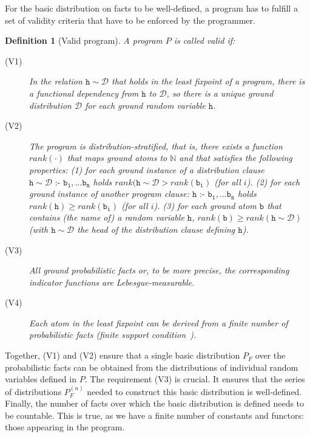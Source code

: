 \documentclass{tlp}
\newtheorem{definition}{Definition}
\newcommand{\coloneq}{\mbox{ :- }}
\begin{document}
For the basic distribution on facts to be well-defined, a program has
to fulfill a set of validity criteria that have to be enforced by the
programmer.

\begin{definition}[Valid program]
  \label{def:validprog}
  A program $P$ is called \emph{valid} if: 

 \begin{description}
  \item[(V1)] In the relation $\mathtt{h} \sim \mathcal{D}$ that holds
    in the least fixpoint of a program, there is a functional
    dependency from $\mathtt{h}$ to $ \mathcal{D}$, so there is a
    unique ground distribution $ \mathcal{D}$ for each ground random
    variable $\mathtt{h}$.

  \item[(V2)] The program is \emph{distribution-stratified}, that is,
    there exists a function $rank(\cdot)$ that maps ground atoms to
   $\mathbb{N}$ and that satisfies the following properties: (1)
    for each ground instance of a distribution clause $\mathtt{h}\sim
    \mathcal{D} \coloneq \mathtt{b_1, \ldots b_n}$ holds
    $rank(\mathtt{h}\sim \mathcal{D} > rank(\mathtt{b_i})$ (for all
    $i$).  (2) for each ground instance of another program clause:
    $\mathtt{h} \coloneq \mathtt{b_1, \ldots b_n}$ holds
    $rank(\mathtt{h})\geq rank(\mathtt{b_i})$ (for all $i$).  (3) for
    each ground atom $\mathtt{b}$ that contains (the name of) a random
    variable $\mathtt{h}$, $rank(\mathtt{b}) \geq rank(\mathtt{h} \sim
    \mathcal{D})$ (with $\mathtt{h} \sim \mathcal{D}$ the head of the
    distribution clause defining $\mathtt{h}$).

  \item[(V3)] All ground probabilistic facts or, to be more precise,
    the corresponding indicator functions are
    \emph{Lebesgue-measurable}.

  \item[(V4)] Each atom in the least fixpoint can be derived from a
    finite number of probabilistic facts (\emph{finite support
      condition}~\cite{Sato:95}).
  \end{description}
\end{definition}

Together, (V1) and (V2) ensure that a single basic distribution $P_F$
over the probabilistic facts can be obtained from the distributions of
individual random variables defined in $P$.  The requirement (V3) is
crucial.  It ensures that the series of distributions $P_F^{(n)}$
needed to construct this basic distribution is well-defined.  Finally,
the number of facts over which the basic distribution is defined needs
to be countable. This is true, as we have a finite number of constants
and functors: those appearing in the program.
\end{document}
